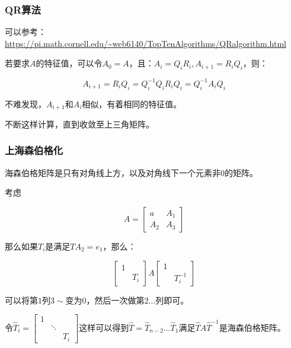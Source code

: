 \documentclass[10pt]{beamer}
\begin{document}
	\begin{frame}
		\frametitle{QR算法}
	
		可以参考：\url{https://pi.math.cornell.edu/~web6140/TopTenAlgorithms/QRalgorithm.html}
		
		若要求$A$的特征值，可以令$A_0=A$，且：$A_i=Q_iR_i,A_{i+1}=R_iQ_i$，则：

		$$
		A_{i+1}=R_iQ_i=Q_i^{-1}Q_iR_iQ_i=Q_i^{-1}A_iQ_i
		$$

		不难发现，$A_{i+1}$和$A_i$相似，有着相同的特征值。

		不断这样计算，直到收敛至上三角矩阵。
	
	\end{frame}
	\begin{frame}
		\frametitle{上海森伯格化}
	
		海森伯格矩阵是只有对角线上方，以及对角线下一个元素非0的矩阵。

		考虑
		
		$$
		A=\begin{bmatrix}
			a&A_1\\A_2&A_3
		\end{bmatrix}
		$$

		那么如果$T_i$是满足$TA_2=e_1$，那么：

		$$
		\begin{bmatrix}
			1\\&T_i
		\end{bmatrix}A\begin{bmatrix}
			1\\&T_i^{-1}
		\end{bmatrix}
		$$

		可以将第$1$列$3\sim$变为$0$，然后一次做第$2\dots $列即可。

		令$\hat T_i=\begin{bmatrix}
			1\\&\ddots\\&&T_i
		\end{bmatrix}$这样可以得到$\hat T=\hat T_{n-2}\dots \hat T_1$满足$\hat TA\hat T^{-1}$是海森伯格矩阵。
	
	\end{frame}
\end{document}

